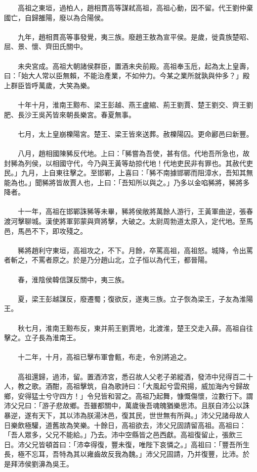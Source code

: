 　　高祖之東垣，過柏人，趙相貫高等謀弒高祖，高祖心動，因不留。代王劉仲棄國亡，自歸雒陽，廢以為合陽侯。
\\\\
　　九年，趙相貫高等事發覺，夷三族。廢趙王敖為宣平侯。是歲，徙貴族楚昭、屈、景、懷、齊田氏關中。
\\\\
　　未央宮成。高祖大朝諸侯群臣，置酒未央前殿。高祖奉玉卮，起為太上皇壽，曰：「始大人常以臣無賴，不能治產業，不如仲力。今某之業所就孰與仲多？」殿上群臣皆呼萬歲，大笑為樂。
\\\\
　　十年十月，淮南王黥布、梁王彭越、燕王盧綰、荊王劉賈、楚王劉交、齊王劉肥、長沙王吳芮皆來朝長樂宮。春夏無事。
\\\\
　　七月，太上皇崩櫟陽宮。楚王、梁王皆來送葬。赦櫟陽囚。更命酈邑曰新豐。
\\\\
　　八月，趙相國陳豨反代地。上曰：「豨嘗為吾使，甚有信。代地吾所急也，故封豨為列侯，以相國守代，今乃與王黃等劫掠代地！代地吏民非有罪也。其赦代吏民。」九月，上自東往擊之。至邯鄲，上喜曰：「豨不南據邯鄲而阻漳水，吾知其無能為也。」聞豨將皆故賈人也，上曰：「吾知所以與之。」乃多以金啗豨將，豨將多降者。
\\\\
　　十一年，高祖在邯鄲誅豨等未畢，豨將侯敞將萬餘人游行，王黃軍曲逆，張春渡河擊聊城。漢使將軍郭蒙與齊將擊，大破之。太尉周勃道太原入，定代地。至馬邑，馬邑不下，即攻殘之。
\\\\
　　豨將趙利守東垣，高祖攻之，不下。月餘，卒罵高祖，高祖怒。城降，令出罵者斬之，不罵者原之。於是乃分趙山北，立子恒以為代王，都晉陽。
\\\\
　　春，淮陰侯韓信謀反關中，夷三族。
\\\\
　　夏，梁王彭越謀反，廢遷蜀；復欲反，遂夷三族。立子恢為梁王，子友為淮陽王。
\\\\
　　秋七月，淮南王黥布反，東并荊王劉賈地，北渡淮，楚王交走入薛。高祖自往擊之。立子長為淮南王。
\\\\
　　十二年，十月，高祖已擊布軍會甀，布走，令別將追之。
\\\\
　　高祖還歸，過沛，留。置酒沛宮，悉召故人父老子弟縱酒，發沛中兒得百二十人，教之歌。酒酣，高祖擊筑，自為歌詩曰：「大風起兮雲飛揚，威加海內兮歸故鄉，安得猛士兮守四方！」令兒皆和習之。高祖乃起舞，慷慨傷懷，泣數行下。謂沛父兄曰：「游子悲故鄉。吾雖都關中，萬歲後吾魂魄猶樂思沛。且朕自沛公以誅暴逆，遂有天下，其以沛為朕湯沐邑，復其民，世世無有所與。」沛父兄諸母故人日樂飲極驩，道舊故為笑樂。十餘日，高祖欲去，沛父兄固請留高祖。高祖曰：「吾人眾多，父兄不能給。」乃去。沛中空縣皆之邑西獻。高祖復留止，張飲三日。沛父兄皆頓首曰：「沛幸得復，豐未復，唯陛下哀憐之。」高祖曰：「豐吾所生長，極不忘耳，吾特為其以雍齒故反我為魏。」沛父兄固請，乃并復豐，比沛。於是拜沛侯劉濞為吳王。
